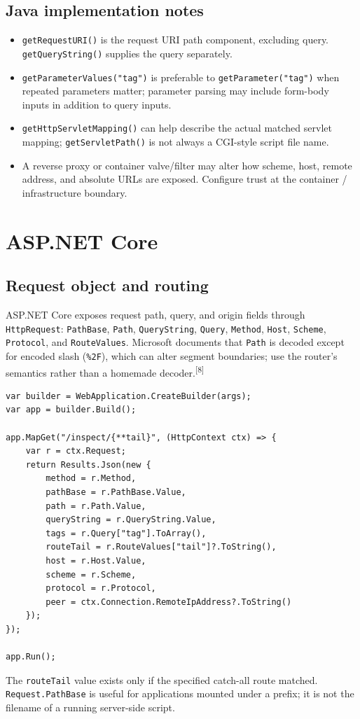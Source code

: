 \documentclass[10pt,letterpaper,oneside]{article}
\newcommand{\refs}[1]{\textsuperscript{\color{blue}[#1]}}
\newcommand{\code}[1]{\texttt{#1}}
\begin{document}
\subsection{Java implementation notes}
\begin{itemize}
\item \code{getRequestURI()} is the request URI path component, excluding query. \code{getQueryString()} supplies the query separately.
\item \code{getParameterValues("tag")} is preferable to \code{getParameter("tag")} when repeated parameters matter; parameter parsing may include form-body inputs in addition to query inputs.
\item \code{getHttpServletMapping()} can help describe the actual matched servlet mapping; \code{getServletPath()} is not always a CGI-style script file name.
\item A reverse proxy or container valve/filter may alter how scheme, host, remote address, and absolute URLs are exposed. Configure trust at the container / infrastructure boundary.
\end{itemize}

\section{ASP.NET Core}
\subsection{Request object and routing}
ASP.NET Core exposes request path, query, and origin fields through \code{HttpRequest}: \code{PathBase}, \code{Path}, \code{QueryString}, \code{Query}, \code{Method}, \code{Host}, \code{Scheme}, \code{Protocol}, and \code{RouteValues}. Microsoft documents that \code{Path} is decoded except for encoded slash (\code{\%2F}), which can alter segment boundaries; use the router's semantics rather than a homemade decoder.\refs{8}
\begin{lstlisting}[language=CSharpLite,caption={ASP.NET Core minimal API (Program.cs; development only)}]
var builder = WebApplication.CreateBuilder(args);
var app = builder.Build();

app.MapGet("/inspect/{**tail}", (HttpContext ctx) => {
    var r = ctx.Request;
    return Results.Json(new {
        method = r.Method,
        pathBase = r.PathBase.Value,
        path = r.Path.Value,
        queryString = r.QueryString.Value,
        tags = r.Query["tag"].ToArray(),
        routeTail = r.RouteValues["tail"]?.ToString(),
        host = r.Host.Value,
        scheme = r.Scheme,
        protocol = r.Protocol,
        peer = ctx.Connection.RemoteIpAddress?.ToString()
    });
});

app.Run();
\end{lstlisting}
The \code{routeTail} value exists only if the specified catch-all route matched. \code{Request.PathBase} is useful for applications mounted under a prefix; it is not the filename of a running server-side script.
\end{document}
